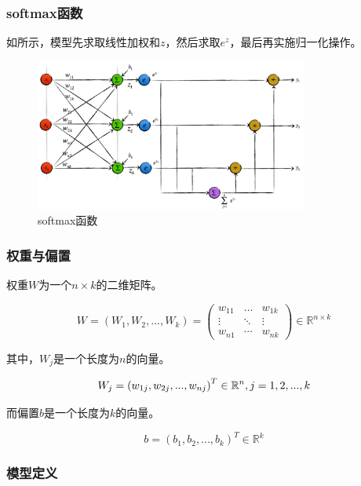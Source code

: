 \begin{content}
\begin{content}
\subsubsection{softmax函数}

如所示，模型先求取线性加权和$z$，然后求取$e^z$，最后再实施归一化操作。

\begin{figure}[H]
\centering
\includegraphics[width=0.8\textwidth]{figures/softmax.png}
\caption{softmax函数}
 \label{fig:softmax}
\end{figure}

\subsubsection{权重与偏置}

权重$W$为一个$n \times k$的二维矩阵。

\[
W = \left( {{W_1},{W_2},...,{W_k}} \right) = \left( {\begin{array}{*{20}{c}}
  {{w_{11}}}& \ldots &{{w_{1k}}} \\ 
   \vdots & \ddots & \vdots  \\ 
  {{w_{n1}}}& \cdots &{{w_{nk}}} 
\end{array}} \right) \in {\mathbb{R}^{n \times k}}
\]

其中，$W_j$是一个长度为$n$的向量。

\[
{W_j} = {\left( {{w_{1j}},{w_{2j}},...,{w_{nj}}} \right)^T} \in {\mathbb{R}^n}, j = 1,2,...,k \\
\]

而偏置$b$是一个长度为$k$的向量。

\[
b = {({b_1},{b_2},...,{b_k})^T} \in {\mathbb{R}^k}
\]

\subsubsection{模型定义}


\end{content}
\end{content}

